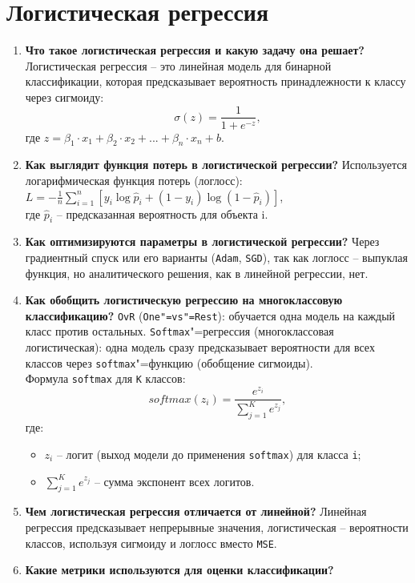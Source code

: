 \documentclass{article}
\begin{document}
\section{Логистическая регрессия}
\begin{enumerate}
    \item \textbf{Что такое логистическая регрессия и какую задачу она решает?} Логистическая регрессия -- это линейная модель для бинарной классификации, которая предсказывает вероятность принадлежности к классу через сигмоиду:
    $$
    \sigma(z) = \frac{1}{1 + e^{-z}},
    $$
    где $z = \beta_{1} \cdot x_1 + \beta_{2} \cdot x_2 + ... + \beta_{n} \cdot x_n + b$.
    \item \textbf{Как выглядит функция потерь в логистической регрессии?} Используется логарифмическая функция потерь (логлосс): \\
    $L = -\frac{1}{n}\sum_{i=1}^{n}[y_i\log\hat{p}_i + (1 - y_{i})\log(1 - \hat{p}_i)]$, \\
    где $\hat{p}_i$ -- предсказанная вероятность для объекта i.
    \item \textbf{Как оптимизируются параметры в логистической регрессии?} Через градиентный спуск или его варианты (\texttt{Adam}, \texttt{SGD}), так как логлосс -- выпуклая функция, но аналитического решения, как в линейной регрессии, нет.
    \item \textbf{Как обобщить логистическую регрессию на многоклассовую классификацию?} \texttt{OvR} (\texttt{One"=vs"=Rest}): обучается одна модель на каждый класс против остальных. \texttt{Softmax}"=регрессия (многоклассовая логистическая): одна модель сразу предсказывает вероятности для всех классов через \texttt{softmax}"=функцию (обобщение сигмоиды). \\
    Формула \texttt{softmax} для \texttt{K} классов:
    $$
    softmax(z_i) = \frac{e^{z_i}}{\sum_{j=1}^{K}e^{z_j}},
    $$
    где:
    \begin{itemize}
        \item $z_i$ -- логит (выход модели до применения \texttt{softmax}) для класса \texttt{i};
        \item $\sum_{j=1}^{K}e^{z_j}$ -- сумма экспонент всех логитов.
    \end{itemize}
    \item \textbf{Чем логистическая регрессия отличается от линейной?} Линейная регрессия предсказывает непрерывные значения, логистическая -- вероятности классов, используя сигмоиду и логлосс вместо \texttt{MSE}.
    \item \textbf{Какие метрики используются для оценки классификации?}

\end{enumerate}
\end{document}
